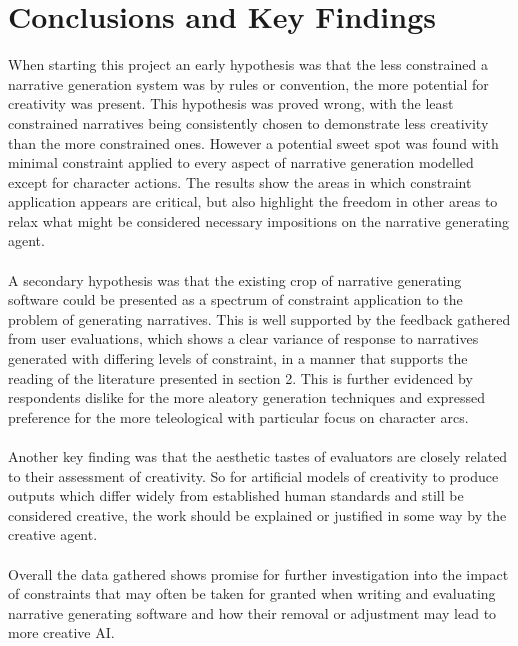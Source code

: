 \documentclass[letterpaper]{article}
\begin{document}
\section{Conclusions and Key Findings}
When starting this project an early hypothesis was that the less constrained a narrative generation system was by rules or convention, the more potential for creativity was present. This hypothesis was proved wrong, with the least constrained narratives being consistently chosen to demonstrate less creativity than the more constrained ones. However a potential sweet spot was found with minimal constraint applied to every aspect of narrative generation modelled except for character actions. The results show the areas in which constraint application appears are critical, but also highlight the freedom in other areas to relax what might be considered necessary impositions on the narrative generating agent.\\
\\A secondary hypothesis was that the existing crop of narrative generating software could be presented as a spectrum of constraint application to the problem of generating narratives. This is well supported by the feedback gathered from user evaluations, which shows a clear variance of response to narratives generated with differing levels of constraint, in a manner that supports the reading of the literature presented in section 2. This is further evidenced by respondents dislike for the more aleatory generation techniques and expressed preference for the more teleological with particular focus on character arcs.\\
\\Another key finding was that the aesthetic tastes of evaluators are closely related to their assessment of creativity. So for artificial models of creativity to produce outputs which differ widely from established human standards and still be considered creative, the work should be explained or justified in some way by the creative agent.\\
\\Overall the data gathered shows promise for further investigation into the impact of constraints that may often be taken for granted when writing and evaluating narrative generating software and how their removal or adjustment may lead to more creative AI. 


\end{document}
